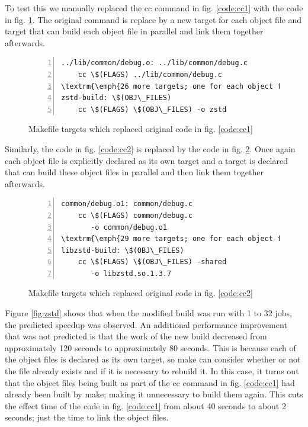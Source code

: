 \documentclass[sigconf,10pt,review,authorversion]{acmart}\settopmatter{printfolios=true,printccs=false,printacmref=false}
\begin{document}
To test this we manually replaced the cc command in fig. \ref{code:cc1} with the code in fig.
\ref{code:cc3}.  The original command is replace by a new target for each object file and target
that can build each object file in parallel and link them together afterwards.

\begin{figure}[H]
\begin{Verbatim}[commandchars=\\\{\},codes={\catcode`$=3\catcode`^=7\catcode`_=8},fontsize=\small,numbers=left,xleftmargin=5mm]
../lib/common/debug.o: ../lib/common/debug.c                                                       
    cc \$(FLAGS) ../lib/common/debug.c
\textrm{\emph{26 more targets; one for each object file}}    
zstd-build: \$(OBJ\_FILES)
    cc \$(FLAGS) \$(OBJ\_FILES) -o zstd
\end{Verbatim}
\caption{Makefile targets which replaced original code in fig. \ref{code:cc1}}
\label{code:cc3}
\end{figure}

Similarly, the code in fig. \ref{code:cc2} is replaced by the code in fig. \ref{code:cc4}.  Once
again each object file is explicitly declared as its own target and a target is declared that can
build these object files in parallel and then link them together afterwards.

\begin{figure}[H]
  \begin{Verbatim}[commandchars=\\\{\},codes={\catcode`$=3\catcode`^=7\catcode`_=8},fontsize=\small,numbers=left,xleftmargin=5mm]
common/debug.o1: common/debug.c
    cc \$(FLAGS) common/debug.c
       -o common/debug.o1
\textrm{\emph{29 more targets; one for each object file}}
libzstd-build: \$(OBJ\_FILES)
    cc \$(FLAGS) \$(OBJ\_FILES) -shared
       -o libzstd.so.1.3.7
\end{Verbatim}
\caption{Makefile targets which replaced original code in fig. \ref{code:cc2}}
\label{code:cc4}
\end{figure}

Figure \ref{fig:zstd} shows that when the modified build was run with 1 to 32 jobs,
the predicted speedup was observed.  An additional performance improvement that was not predicted
is that the work of the new build decreased from approximately 120 seconds to approximately 80 seconds.
This is because each of the object files is declared as its own target, so make can consider whether
or not the file already exists and if it is necessary to rebuild it.  In this case, it turns out that
the object files being built as part of the cc command in fig. \ref{code:cc1} had already been built
by make; making it unnecessary to build them again.  This cuts the effect time of the code in fig.
\ref{code:cc1} from about 40 seconds to about 2 seconds; just the time to link the object files.
\end{document}
